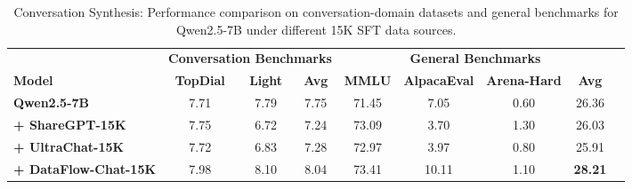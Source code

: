 \begin{table}[t]
\centering
\small
\caption{Conversation Synthesis: Performance comparison on conversation-domain datasets and general benchmarks for Qwen2.5-7B under different 15K SFT data sources.}
\label{tab:conversation}
\begin{tabular}{lcccccccc}
\toprule
& \multicolumn{3}{c}{\textbf{Conversation Benchmarks}} 
& \multicolumn{4}{c}{\textbf{General Benchmarks}} \\
\cmidrule(lr){2-4} \cmidrule(lr){5-8}
\textbf{Model} 
& \textbf{TopDial} & \textbf{Light} & \textbf{Avg} 
& \textbf{MMLU} & \textbf{AlpacaEval} & \textbf{Arena-Hard} & \textbf{Avg} \\
\midrule
\textbf{Qwen2.5-7B} 
& 7.71 & 7.79 & 7.75 
& 71.45 & 7.05 & 0.60 & 26.36 \\
\textbf{+ ShareGPT-15K} 
& 7.75 & 6.72 & 7.24 
& 73.09 & 3.70 & 1.30 & 26.03 \\
\textbf{+ UltraChat-15K} 
& 7.72 & 6.83 & 7.28 
& 72.97 & 3.97 & 0.80 & 25.91 \\
\textbf{+ DataFlow-Chat-15K} 
& 7.98 & 8.10 & 8.04 
& 73.41 & 10.11 & 1.10 & \textbf{28.21} \\
\bottomrule
\end{tabular}
\end{table}
